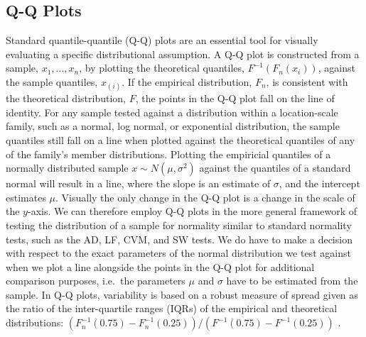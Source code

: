 \documentclass{article}\usepackage[]{graphicx}\usepackage[]{color}
\newcommand{\alnote}[1]{\todo[inline,color=green!40]{#1}}
\newcommand{\hhnote}[1]{\todo[inline,color=magenta!40]{#1}}
\begin{document}
\subsection{Q-Q Plots}

Standard quantile-quantile (Q-Q) plots \citep{Wilk:1968} are an essential tool for  visually evaluating a specific distributional assumption.  A Q-Q plot  is constructed from a sample, $x_1, \ldots, x_n$, by plotting the theoretical quantiles, $F^{-1}(F_n(x_i))$, against the sample quantiles, $x_{(i)}$. If the empirical distribution, $F_n$, is consistent with the theoretical distribution, $F$, the points in the Q-Q plot fall on the line of identity. 
For any sample tested against a distribution within a location-scale family, such as a normal, log normal, or exponential distribution, the sample quantiles still fall on a line when plotted against the theoretical quantiles of any of the family's member distributions. Plotting the empiricial quantiles of a normally distributed sample $x \sim N(\mu, \sigma^2)$ against the quantiles of a standard normal will result in a line, where  the slope is an estimate of $\sigma$, and the intercept estimates $\mu$. Visually  the only change in the Q-Q plot is a  change in the scale of the $y$-axis. We can therefore employ Q-Q plots in the more general framework of testing the distribution of a sample for normality similar to standard normality tests, such as the AD, LF, CVM, and SW tests. We do have to make a decision with respect to the exact parameters of the normal distribution we test against when we plot a line alongside the points in the Q-Q plot for additional comparison purposes, i.e.~the parameters $\mu$ and $\sigma$ have to be estimated from the sample. In Q-Q plots, variability is based on a robust measure of spread given as the ratio of the inter-quartile ranges (IQRs) of the empirical and theoretical distributions: $\left(F^{-1}_n(0.75) - F^{-1}_n(0.25)\right) / \left(F^{-1}(0.75) - F^{-1}(0.25)\right)$ \citep{becker:s}. 

\end{document}
